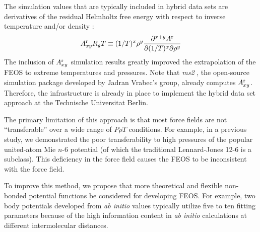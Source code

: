 \documentclass[11pt,a4paper]{article}
\begin{document}
The simulation values that are typically included in hybrid data sets are derivatives of the residual Helmholtz free energy with respect to inverse temperature and/or density \cite{Thol2016_siloxane_first,Thol2016_siloxane,Thol2017,Rutkai2013,Thol2015}:
\begin{equation} \label{Residual Derivatives}
A_{xy}^{\rm r} R_gT \equiv (1/T)^x\rho^y \frac{\partial^{x+y}A^{\rm r}}{\partial(1/T)^x \partial \rho^y}
\end{equation}
The inclusion of $A_{xy}^{\rm r}$ simulation results greatly improved the extrapolation of the FEOS to extreme temperatures and pressures.
Note that \textit{ms2} \cite{ms2}, the open-source simulation package developed by Jadran Vrabec's group, already computes $A_{xy}^{\rm r}$. Therefore, the infrastructure is already in place to implement the hybrid data set approach at the Technische Universitat Berlin.

The primary limitation of this approach is that most force fields are not ``transferable'' over a wide range of $P \rho T$ conditions. For example, in a previous study, we demonstrated the poor transferability to high pressures of the popular united-atom Mie $n$-6 potential (of which the traditional Lennard-Jones 12-6 is a subclass). This deficiency in the force field causes the FEOS to be inconsistent with the force field. 





To improve this method, we propose that more theoretical and flexible non-bonded potential functions be considered for developing FEOS. For example, two body potentials developed from \textit{ab initio} values typically utilize five to ten fitting parameters because of the high information content in \textit{ab initio} calculations at different intermolecular distances.
\end{document}
